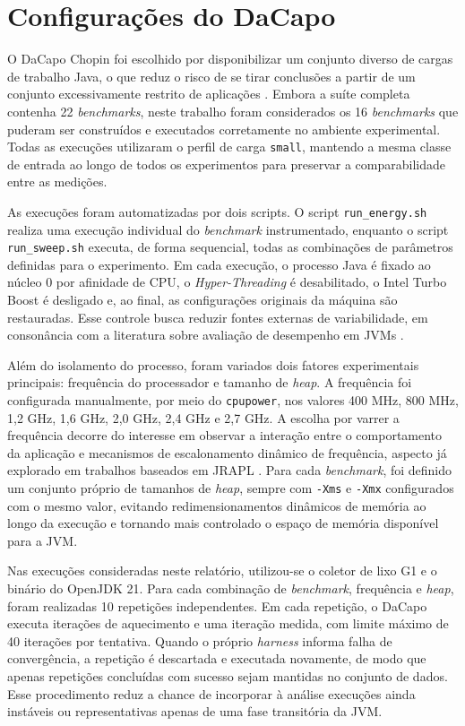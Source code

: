 \section{Configurações do DaCapo}

O DaCapo Chopin foi escolhido por disponibilizar um conjunto diverso de cargas
de trabalho Java, o que reduz o risco de se tirar conclusões a partir de um
conjunto excessivamente restrito de aplicações \cite{dacapochopin}. Embora a
suíte completa contenha 22 \textit{benchmarks}, neste trabalho foram
considerados os 16 \textit{benchmarks} que puderam ser construídos e executados
corretamente no ambiente experimental. Todas as execuções utilizaram o perfil
de carga \texttt{small}, mantendo a mesma classe de entrada ao longo de todos
os experimentos para preservar a comparabilidade entre as medições.

As execuções foram automatizadas por dois scripts. O script
\texttt{run\_energy.sh} realiza uma execução individual do \textit{benchmark}
instrumentado, enquanto o script \texttt{run\_sweep.sh} executa, de forma
sequencial, todas as combinações de parâmetros definidas para o experimento. Em
cada execução, o processo Java é fixado ao núcleo 0 por afinidade de CPU, o
\textit{Hyper-Threading} é desabilitado, o Intel Turbo Boost é desligado e, ao
final, as configurações originais da máquina são restauradas. Esse controle
busca reduzir fontes externas de variabilidade, em consonância com a literatura
sobre avaliação de desempenho em JVMs
\cite{vms-hot-and-cold, steady-state-assessment}.

Além do isolamento do processo, foram variados dois fatores experimentais
principais: frequência do processador e tamanho de \textit{heap}. A frequência
foi configurada manualmente, por meio do \texttt{cpupower}, nos valores
400 MHz, 800 MHz, 1{,}2 GHz, 1{,}6 GHz, 2{,}0 GHz, 2{,}4 GHz e 2{,}7 GHz. A
escolha por varrer a frequência decorre do interesse em observar a interação
entre o comportamento da aplicação e mecanismos de escalonamento dinâmico de
frequência, aspecto já explorado em trabalhos baseados em JRAPL \cite{jrapl}.
Para cada \textit{benchmark}, foi definido um conjunto próprio de tamanhos de
\textit{heap}, sempre com \texttt{-Xms} e \texttt{-Xmx} configurados com o
mesmo valor, evitando redimensionamentos dinâmicos de memória ao longo da
execução e tornando mais controlado o espaço de memória disponível para a JVM.

Nas execuções consideradas neste relatório, utilizou-se o coletor de lixo G1 e
o binário do OpenJDK 21. Para cada combinação de \textit{benchmark}, frequência
e \textit{heap}, foram realizadas 10 repetições independentes. Em cada
repetição, o DaCapo executa iterações de aquecimento e uma iteração medida, com
limite máximo de 40 iterações por tentativa. Quando o próprio \textit{harness}
informa falha de convergência, a repetição é descartada e executada novamente,
de modo que apenas repetições concluídas com sucesso sejam mantidas no conjunto
de dados. Esse procedimento reduz a chance de incorporar à análise execuções
ainda instáveis ou representativas apenas de uma fase transitória da JVM.


